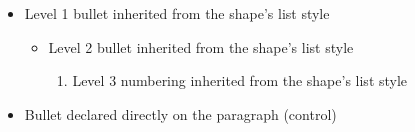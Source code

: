 \documentclass[11pt,a4paper]{article}
\begin{document}
\begin{itemize}
\item Level 1 bullet inherited from the shape's list style
  \begin{itemize}
\item Level 2 bullet inherited from the shape's list style
    \begin{enumerate}
\item Level 3 numbering inherited from the shape's list style
    \end{enumerate}
  \end{itemize}
\end{itemize}

\begin{itemize}
\item Bullet declared directly on the paragraph (control)
\end{itemize}
\end{document}
